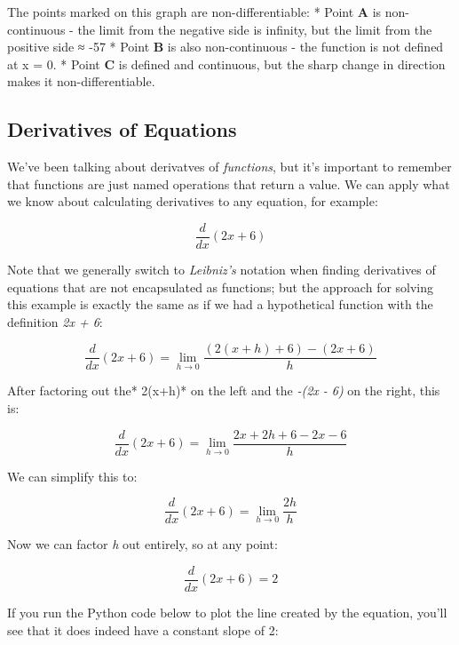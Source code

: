 \documentclass[11pt]{article}
\begin{document}
    The points marked on this graph are non-differentiable: * Point
\textbf{A} is non-continuous - the limit from the negative side is
infinity, but the limit from the positive side ≈ -57 * Point \textbf{B}
is also non-continuous - the function is not defined at x = 0. * Point
\textbf{C} is defined and continuous, but the sharp change in direction
makes it non-differentiable.

    \subsection{Derivatives of Equations}\label{derivatives-of-equations}

We've been talking about derivatves of \emph{functions}, but it's
important to remember that functions are just named operations that
return a value. We can apply what we know about calculating derivatives
to any equation, for example:

\begin{equation}\frac{d}{dx}(2x + 6)\end{equation}

Note that we generally switch to \emph{Leibniz's} notation when finding
derivatives of equations that are not encapsulated as functions; but the
approach for solving this example is exactly the same as if we had a
hypothetical function with the definition \emph{2x + 6}:

\begin{equation}\frac{d}{dx}(2x + 6) = \lim_{h \to 0} \frac{(2(x+h) + 6) - (2x + 6)}{h} \end{equation}

After factoring out the* 2(x+h)* on the left and the \emph{-(2x - 6)} on
the right, this is:

\begin{equation}\frac{d}{dx}(2x + 6) = \lim_{h \to 0} \frac{2x + 2h + 6 - 2x - 6}{h} \end{equation}

We can simplify this to:

\begin{equation}\frac{d}{dx}(2x + 6) = \lim_{h \to 0} \frac{2h}{h} \end{equation}

Now we can factor \emph{h} out entirely, so at any point:

\begin{equation}\frac{d}{dx}(2x + 6) = 2 \end{equation}

If you run the Python code below to plot the line created by the
equation, you'll see that it does indeed have a constant slope of 2:
\end{document}
